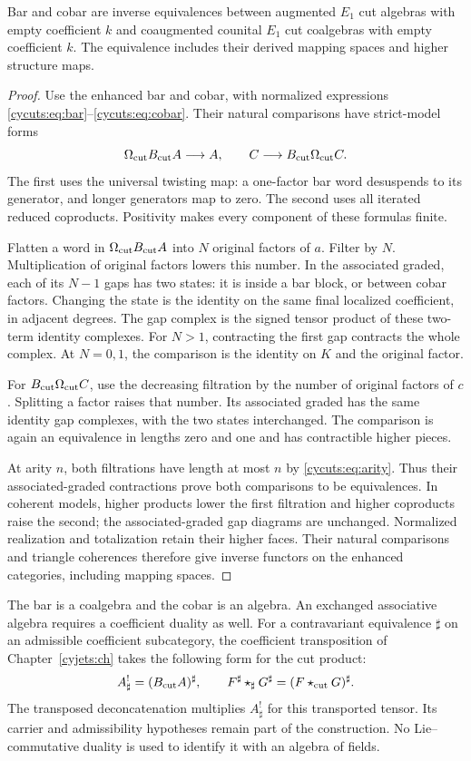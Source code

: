 \begin{theorem}\label{cycuts:thm:duality}
Bar and cobar are inverse equivalences between augmented $E_1$ cut
algebras with empty coefficient $k$ and coaugmented counital $E_1$
cut coalgebras with empty coefficient $k$. The equivalence includes
their derived mapping spaces and higher structure maps.
\end{theorem}
\begin{proof}
Use the enhanced bar and cobar, with normalized expressions
\eqref{cycuts:eq:bar}--\eqref{cycuts:eq:cobar}. Their natural
comparisons have strict-model forms
\[
 \Omega_{\mathrm{cut}}B_{\mathrm{cut}} A\longrightarrow A,
 \qquad C\longrightarrow B_{\mathrm{cut}}\Omega_{\mathrm{cut}} C.
\]
The first uses the universal twisting map: a one-factor bar word
desuspends to its generator, and longer generators map to zero. The second
uses all iterated reduced coproducts. Positivity makes every component
of these formulas finite.

Flatten a word in $\Omega_{\mathrm{cut}}B_{\mathrm{cut}} A$ into $N$ original factors of $a$.
Filter by $N$. Multiplication of original factors lowers this number.
In the associated graded, each of its $N-1$ gaps has two states: it
is inside a bar block, or between cobar factors. Changing the state
is the identity on the same final localized coefficient, in adjacent
degrees. The gap complex is the signed tensor product of these
two-term identity complexes. For $N>1$, contracting the first gap
contracts the whole complex. At $N=0,1$, the comparison is the
identity on $K$ and the original factor.

For $B_{\mathrm{cut}}\Omega_{\mathrm{cut}} C$, use the decreasing filtration by the number
of original factors of $c$. Splitting a factor raises that number.
Its associated graded has the same identity gap complexes, with
the two states interchanged. The comparison is again an equivalence
in lengths zero and one and has contractible higher pieces.

At arity $n$, both filtrations have length at most $n$ by
\eqref{cycuts:eq:arity}. Thus their associated-graded contractions
prove both comparisons to be equivalences. In coherent models, higher
products lower the first filtration and higher coproducts raise the
second; the associated-graded gap diagrams are unchanged. Normalized
realization and totalization retain their higher faces. Their natural
comparisons and triangle coherences therefore give inverse functors
on the enhanced categories, including mapping spaces.
\end{proof}

The bar is a coalgebra and the cobar is an algebra. An exchanged
associative algebra requires a coefficient duality as well. For a
contravariant equivalence $\sharp$ on an admissible coefficient
subcategory, the coefficient transposition of Chapter~\ref{cyjets:ch}
takes the following form for the cut product:
\[
 A^!_\sharp=(B_{\mathrm{cut}} A)^\sharp,
 \qquad
 F^\sharp\star_\sharp G^\sharp=(F\star_{\mathrm{cut}} G)^\sharp.
\]
The transposed deconcatenation multiplies $A^!_\sharp$ for this
transported tensor. Its carrier and admissibility hypotheses remain
part of the construction. No Lie--commutative duality is used to
identify it with an algebra of fields.

